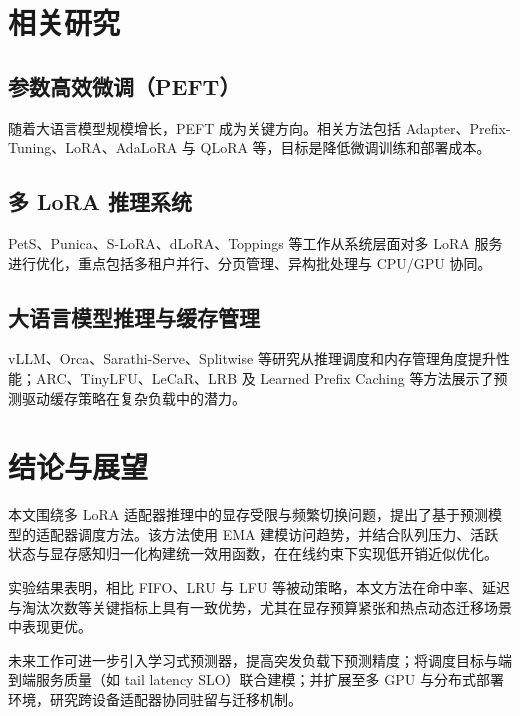 \section{相关研究}
\subsection{参数高效微调（PEFT）}
随着大语言模型规模增长，PEFT 成为关键方向。相关方法包括 Adapter、Prefix-Tuning、LoRA、AdaLoRA 与 QLoRA 等，目标是降低微调训练和部署成本。

\subsection{多 LoRA 推理系统}
PetS、Punica、S-LoRA、dLoRA、Toppings 等工作从系统层面对多 LoRA 服务进行优化，重点包括多租户并行、分页管理、异构批处理与 CPU/GPU 协同。

\subsection{大语言模型推理与缓存管理}
vLLM、Orca、Sarathi-Serve、Splitwise 等研究从推理调度和内存管理角度提升性能；ARC、TinyLFU、LeCaR、LRB 及 Learned Prefix Caching 等方法展示了预测驱动缓存策略在复杂负载中的潜力。

\section{结论与展望}
本文围绕多 LoRA 适配器推理中的显存受限与频繁切换问题，提出了基于预测模型的适配器调度方法。该方法使用 EMA 建模访问趋势，并结合队列压力、活跃状态与显存感知归一化构建统一效用函数，在在线约束下实现低开销近似优化。

实验结果表明，相比 FIFO、LRU 与 LFU 等被动策略，本文方法在命中率、延迟与淘汰次数等关键指标上具有一致优势，尤其在显存预算紧张和热点动态迁移场景中表现更优。

未来工作可进一步引入学习式预测器，提高突发负载下预测精度；将调度目标与端到端服务质量（如 tail latency SLO）联合建模；并扩展至多 GPU 与分布式部署环境，研究跨设备适配器协同驻留与迁移机制。
